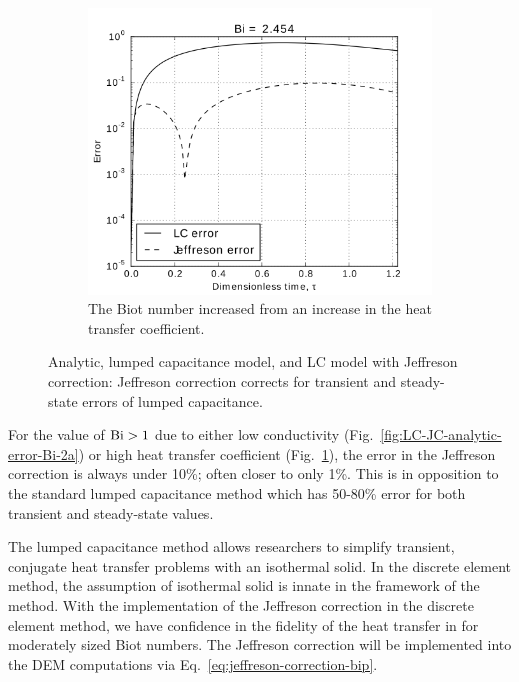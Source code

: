 \begin{figure}
        \begin{subfigure}[b]{0.5\textwidth}
                \includegraphics[width=\textwidth]{chapters/figures/LC-JC-analytic-error-Bi-2b}
                \caption{The Biot number increased from  an increase in the heat transfer coefficient.}
				\label{fig:LC-JC-analytic-error-Bi-2b}
        \end{subfigure}
        \caption[Jeffreson correction for moderate Biot number based on conductivity]{Analytic, lumped capacitance model, and LC model with Jeffreson correction: Jeffreson correction corrects for transient and steady-state errors of lumped capacitance.}\label{fig:LC-JC-analytic-error-Bi-2}
\end{figure}

For the value of $\mathrm{Bi} > 1$ due to either low conductivity (Fig.~\ref{fig:LC-JC-analytic-error-Bi-2a}) or high heat transfer coefficient (Fig.~\ref{fig:LC-JC-analytic-error-Bi-2b}), the error in the Jeffreson correction is always under 10\%; often closer to only 1\%. This is in opposition to the standard lumped capacitance method which has 50-80\% error for both transient and steady-state values.

The lumped capacitance method allows researchers to simplify transient, conjugate heat transfer problems with an isothermal solid. In the discrete element method, the assumption of isothermal solid is innate in the framework of the method. With the implementation of the Jeffreson correction in the discrete element method, we have confidence in the fidelity of the heat transfer in for moderately sized Biot numbers. The Jeffreson correction will be implemented into the DEM computations via Eq.~\ref{eq:jeffreson-correction-bip}. 

